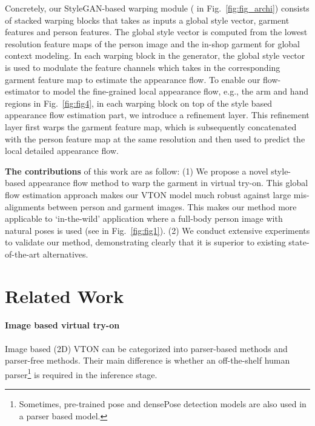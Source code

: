 \documentclass[10pt,twocolumn,letterpaper]{article}
\begin{document}
Concretely, our StyleGAN-based warping module ( in Fig.~\ref{fig:fig_archi}) consists of stacked warping blocks that takes as inputs  a global style vector, garment features and person features. The global style vector is  computed from  the lowest resolution feature maps of the person image and the in-shop garment for global context modeling. In each warping block in the generator, the global style vector is used to modulate the feature channels which takes in the corresponding garment feature map to estimate the appearance flow. To enable our flow-estimator to model the fine-grained local appearance flow, e.g., the arm and hand regions in Fig.~\ref{fig:fig4}, in each warping block on top of the style based appearance flow estimation part, we introduce a refinement layer. This refinement layer first warps the garment feature map, which is subsequently  concatenated with the person feature map at the same resolution and then used to predict the local detailed appearance flow. 

\textbf{The contributions} of this work are as follow: (1) We propose a novel style-based appearance flow method to warp the garment in virtual try-on. This global flow estimation approach makes our VTON model much robust against large mis-alignments between person and garment images. This makes our method more applicable to `in-the-wild' application where a full-body person image with natural poses is used (see in Fig.~\ref{fig:fig1}). (2) We conduct extensive experiments to validate our method, demonstrating clearly that it is superior to existing state-of-the-art alternatives. 


\section{Related Work}
\paragraph{Image based virtual try-on} Image based (2D) VTON can be categorized into parser-based methods and parser-free methods. Their main difference is whether an off-the-shelf human parser\footnote{Sometimes, pre-trained pose \cite{cao2017realtime} and densePose \cite{guler2018densepose} detection models are also used in a parser based model.} is required in the inference stage.
\end{document}
